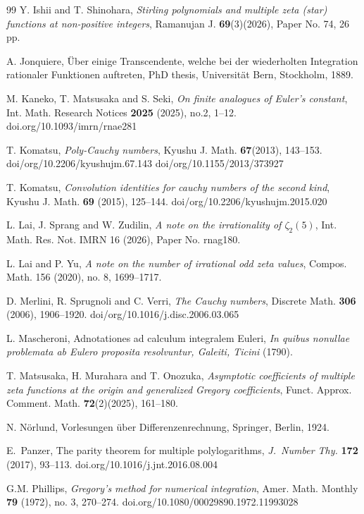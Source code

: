 \documentclass[11pt]{article}
\theoremstyle{plain}
\theoremstyle{definition}
\begin{document}
\begin{thebibliography}{99}
Y. Ishii and T. Shinohara, \emph{Stirling polynomials and multiple zeta (star) functions at non-positive integers}, Ramanujan J. \textbf{69}(3)(2026), Paper No. 74, 26 pp.

A. Jonquiere, \"Uber einige Transcendente, welche bei der wiederholten Integration rationaler Funktionen
auftreten, PhD thesis, Universit\"at Bern, Stockholm, 1889.

M. Kaneko, T. Matsusaka and S. Seki, \emph{On finite analogues of Euler's constant}, Int. Math. Research Notices {\bf 2025} (2025), no.2, 1--12. doi.org/10.1093/imrn/rnae281

T. Komatsu, \emph{Poly-Cauchy numbers}, Kyushu J. Math. \textbf{67}(2013), 143--153. doi/org/10.2206/kyushujm.67.143
doi/org/10.1155/2013/373927

T. Komatsu, \emph{Convolution identities for cauchy numbers of the second kind}, Kyushu J. Math. \textbf{69} (2015), 125--144. doi/org/10.2206/kyushujm.2015.020

L. Lai, J. Sprang and W. Zudilin, \emph{A note on the irrationality of $\zeta_2(5)$}, Int. Math. Res. Not. IMRN 16 (2026), Paper No. rnag180.

L. Lai and P. Yu, \emph{A note on the number of irrational odd zeta values}, Compos. Math. 156 (2020), no. 8, 1699--1717.

D. Merlini, R. Sprugnoli and C. Verri, \emph{The Cauchy numbers}, Discrete Math. \textbf{306} (2006), 1906--1920. doi/org/10.1016/j.disc.2006.03.065

L. Mascheroni, Adnotationes ad calculum integralem Euleri, \emph{In quibus nonullae problemata ab Eulero proposita resolvuntur, Galeiti, Ticini} (1790).

T. Matsusaka, H. Murahara and T. Onozuka, \emph{Asymptotic coefficients of multiple zeta functions at the origin and generalized Gregory coefficients}, Funct. Approx. Comment. Math. \textbf{72}(2)(2025), 161--180.

N. N\"orlund, Vorlesungen \"uber Differenzenrechnung, Springer, Berlin, 1924.

E.\ Panzer, The parity theorem for multiple polylogarithms, \emph{J.\ Number Thy.}
\textbf{172} (2017), 93--113. doi.org/10.1016/j.jnt.2016.08.004

G.M. Phillips, \emph{Gregory's method for numerical integration}, Amer. Math. Monthly  \textbf{79} (1972), no. 3,  270--274. doi.org/10.1080/00029890.1972.11993028


\end{thebibliography}
\end{document}
